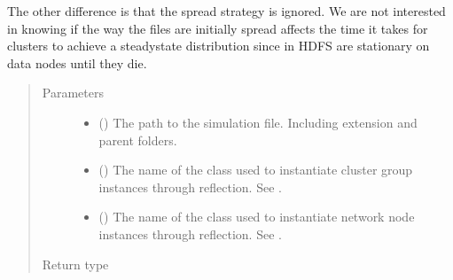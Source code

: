 \documentclass[letterpaper,10pt,english]{sphinxmanual}
\begin{document}
\begin{fulllineitems}
\begin{fulllineitems}
\begin{description}
\begin{itemize}
\end{itemize}

The other difference is that the spread strategy is ignored.
We are not interested in knowing if the way the files are
initially spread affects the time it takes for clusters to
achieve a steady\sphinxhyphen{}state distribution since in HDFS
{\hyperref[\detokenize{app.domain.helpers:app.domain.helpers.smart_dataclasses.FileBlockData}]{}} are
stationary on data nodes until they die.

\end{description}
\begin{quote}\begin{description}
\item[{Parameters}] \leavevmode\begin{itemize}
\item {} 
 () \textendash{} The path to the simulation file. Including extension and
parent folders.

\item {} 
 () \textendash{} The name of the class used to instantiate cluster group
instances through reflection.
See {\hyperref[\detokenize{app.domain:module-app.domain.cluster_groups}]{}}.

\item {} 
 () \textendash{} The name of the class used to instantiate network node
instances through reflection.
See {\hyperref[\detokenize{app.domain:module-app.domain.network_nodes}]{}}.

\end{itemize}

\item[{Return type}] \leavevmode
{}

\end{description}\end{quote}

\end{fulllineitems}


\end{fulllineitems}
\end{document}
